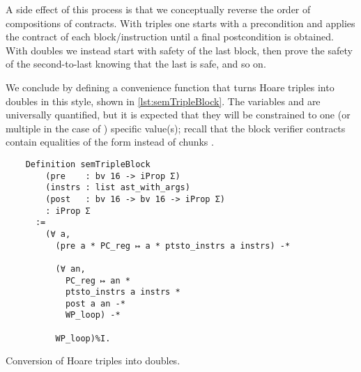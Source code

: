 A side effect of this process is that we conceptually reverse the order of compositions of contracts. With triples one starts with a precondition and applies the contract of each block/instruction until a final postcondition is obtained. With doubles we instead start with safety of the last block, then prove the safety of the second-to-last knowing that the last is safe, and so on.

We conclude by defining a convenience function that turns Hoare triples into doubles in this style, shown in \cref{lst:semTripleBlock}. The variables  and  are universally quantified, but it is expected that they will be constrained to one (or multiple in the case of ) specific value(s); recall that the block verifier contracts contain equalities of the form  instead of chunks .

\vspace{1.25cm}

\begin{listing}[ht]
  \begin{verbatim}
    Definition semTripleBlock
        (pre    : bv 16 -> iProp Σ)
        (instrs : list ast_with_args)
        (post   : bv 16 -> bv 16 -> iProp Σ)
        : iProp Σ
      :=
        (∀ a,
          (pre a * PC_reg ↦ a * ptsto_instrs a instrs) -*

          (∀ an,
            PC_reg ↦ an *
            ptsto_instrs a instrs *
            post a an -*
            WP_loop) -*

          WP_loop)%I.
  \end{verbatim}
  \caption{Conversion of Hoare triples into doubles.}
  \label{lst:semTripleBlock}
\end{listing}

\vspace{1.5cm}



